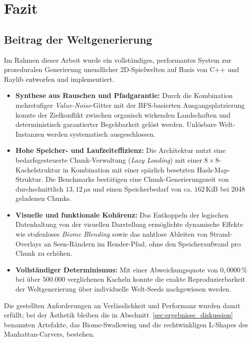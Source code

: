 \documentclass[
  a4paper,
  11pt,
  twoside,
  BCOR=8mm,           %
  headings=big,
  numbers=noenddot,
  listof=totoc,       %
  captions=tableheading,
]{scrreprt}
\begin{document}
\section{Fazit}
\label{sec:fazit_gesamt}

\subsection{Beitrag der Weltgenerierung}
\label{sec:fazit_weltgenerierung}
Im Rahmen dieser Arbeit wurde ein vollständiges, performantes System zur prozeduralen Generierung unendlicher 2D-Spielwelten auf Basis von C++ und Raylib entworfen und implementiert.

\begin{itemize}
    \item \textbf{Synthese aus Rauschen und Pfadgarantie:} Durch die Kombination mehrstufiger \textit{Value-Noise}-Gitter mit der BFS-basierten Ausgangsplatzierung konnte der Zielkonflikt zwischen organisch wirkenden Landschaften und deterministisch garantierter Begehbarkeit gelöst werden. Unlösbare Welt-Instanzen werden systematisch ausgeschlossen.
    \item \textbf{Hohe Speicher- und Laufzeiteffizienz:} Die Architektur nutzt eine bedarfsgesteuerte Chunk-Verwaltung (\textit{Lazy Loading}) mit einer $8 \times 8$-Kachelstruktur in Kombination mit einer spärlich besetzten Hash-Map-Struktur. Die Benchmarks bestätigen eine Chunk-Generierungszeit von durchschnittlich $13{,}12\,\mu\text{s}$ und einen Speicherbedarf von ca. $162\,\text{KiB}$ bei 2048 geladenen Chunks.
    \item \textbf{Visuelle und funktionale Kohärenz:} Das Entkoppeln der logischen Datenhaltung von der visuellen Darstellung ermöglichte dynamische Effekte wie stufenloses \textit{Biome Blending} sowie das nahtlose Ableiten von Strand-Overlays an Seen-Rändern im Render-Pfad, ohne den Speicheraufwand pro Chunk zu erhöhen.
    \item \textbf{Vollständiger Determinismus:} Mit einer Abweichungsquote von $0{,}0000\,\%$ bei über $500.000$ verglichenen Kacheln konnte die exakte Reproduzierbarkeit der Weltgenerierung über individuelle Welt-Seeds nachgewiesen werden.
\end{itemize}

Die gestellten Anforderungen an Verlässlichkeit und Performanz wurden damit erfüllt; bei der Ästhetik bleiben die in Abschnitt~\ref{sec:ergebnisse_diskussion} benannten Artefakte, das Biome-Swallowing und die rechtwinkligen L-Shapes des Manhattan-Carvers, bestehen.
\end{document}
